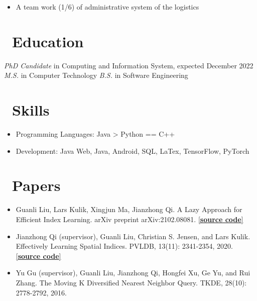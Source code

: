 \documentclass{resume}
\begin{document}
\begin{itemize}
  \item A team work (1/6) of administrative system of the logistics 
\end{itemize}




\section{\faGraduationCap\ Education}
\textit{PhD Candidate} in Computing and Information System, expected December 2022
\textit{M.S.} in Computer Technology
\textit{B.S.} in Software Engineering

\section{\faCogs\ Skills}
\begin{itemize}[parsep=0.5ex]
  \item Programming Languages: Java > Python == C++
  \item Development: Java Web, Java, Android, SQL, LaTex, TensorFlow, PyTorch
  
\end{itemize}

\section{\faFilesO\ Papers}
\begin{itemize}
 \item Guanli Liu, Lars Kulik, Xingjun Ma, Jianzhong Qi. A Lazy Approach for Efficient Index Learning. arXiv preprint arXiv:2102.08081. \href{https://github.com/Liuguanli/ModelReuse}{[\textbf{source code}]} 
 
  \item Jianzhong Qi (supervisor), Guanli Liu, Christian S. Jensen, and Lars Kulik. Effectively Learning Spatial Indices. PVLDB, 13(11): 2341-2354, 2020.  \href{https://github.com/Liuguanli/RSMI}{[\textbf{source code}]}

  \item Yu Gu (supervisor), Guanli Liu, Jianzhong Qi, Hongfei Xu, Ge Yu, and Rui Zhang. The Moving K Diversified Nearest Neighbor Query. TKDE, 28(10): 2778-2792, 2016.
\end{itemize}
\end{document}
